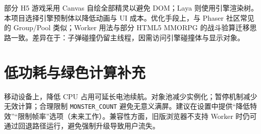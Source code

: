 部分 H5 游戏采用 Canvas 自绘全部精灵以避免 DOM；Laya 则使用引擎渲染树。本项目选择引擎预制体以降低动画与 UI 成本。优化手段上，与 Phaser 社区常见的 Group/Pool 类似\cite{gregory2018game}；Worker 用法与部分 HTML5 MMORPG 的战斗验算迁移思路一致\cite{mckenzie2008crowd}。差异在于：子弹碰撞仍留主线程，因需访问引擎碰撞体与显示对象。

\section{低功耗与绿色计算补充}

移动设备上，降低 CPU 占用可延长电池续航。对象池减少实例化；暂停机制减少无效计算；合理限制 \texttt{MONSTER\_COUNT} 避免无意义满屏。建议在设置中提供“降低特效”“限制帧率”选项（未来工作）。兼容性方面，旧版浏览器不支持 Worker 时仍可通过回退路径运行，避免强制升级导致用户流失\cite{gregory2018game}。
